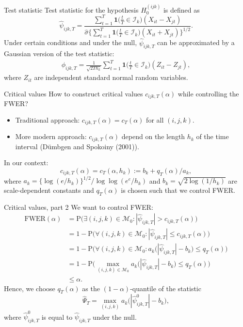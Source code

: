 \documentclass[10pt, handout]{beamer}
\newcommand{\Prob}{\mathrm{P}}
\newcommand{\ind}{\boldsymbol{1}\Big( \frac{t}{T} \in \mathcal{I}_k \Big)} %
\newcommand{\indsmall}{\boldsymbol{1}\big( \frac{t}{T} \in \mathcal{I}_k \big)} %
\begin{document}
\begin{frame}{Test statistic}
Test statistic for the hypothesis $H_0^{(ijk)}$ is defined as
\begin{equation*}
\widehat{\psi}_{ijk, T} = \frac{\sum\nolimits_{t=1}^T \indsmall (X_{it} -X_{jt})}{\hat{\sigma} \big\{ \sum\nolimits_{t=1}^T \indsmall  (X_{it} + X_{jt} )\big\}^{1/2}}. 
\end{equation*} \pause
Under certain conditions and under the null, $\widehat{\psi}_{ijk, T}$ can be approximated by a Gaussian version of the test statistic:
\begin{align*}
\phi_{ijk,T} = \frac{1}{\sqrt{2 T h_k}} \sum\limits_{t=1}^T \ind (Z_{it} - Z_{jt}), 
\end{align*}
where $Z_{it}$ are independent standard normal random variables.
\end{frame}

\begin{frame}{Critical values}
How to construct critical values $c_{ijk,T}(\alpha)$ while controlling the FWER?\pause
\begin{itemize} 
\item Traditional approach: $c_{ijk,T}(\alpha) = c_T(\alpha)$ for all $(i,j,k)$. \pause
\item More modern approach: $c_{ijk,T}(\alpha)$ depend on the length $h_k$ of the time interval (D{\"u}mbgen and Spokoiny (2001)).
\end{itemize}\pause
In our context: 
\vspace{-2mm}
\[c_{ijk,T}(\alpha) = c_T(\alpha,h_k) := b_k + q_T(\alpha)/a_k,\] where $a_k = \{\log(e/h_k)\}^{1/2} / \log \log(e^e / h_k)$ and $b_k = \sqrt{2 \log(1/h_k)}$ are scale-dependent constants and $q_T(\alpha)$ is chosen such that we control FWER.
\end{frame}


\begin{frame}{Critical values, part 2}
We want to control FWER:
\begin{align*}
\text{FWER}(\alpha) &= \Prob \Big( \exists (i,j,k) \in\mathcal{M}_0: |\widehat{\psi}_{ijk, T} | > c_{ijk, T}(\alpha) \Big) \\
&= 1 - \Prob \Big( \forall (i,j,k) \in\mathcal{M}_0: |\widehat{\psi}_{ijk, T} | \le c_{ijk, T}(\alpha) \Big)\\
 & =  1 - \Prob \Big( \forall (i,j,k) \in \mathcal{M}_0: a_k \big(|\hat{\psi}_{ijk,T}| - b_k\big) \le q_T(\alpha) \Big)\\
 & = 1 - \Prob\Big( \max_{(i,j,k) \in \mathcal{M}_0} a_k \big( |\hat{\psi}_{ijk,T}| - b_k \big) \le q_T(\alpha) \Big)\\
 & \le \alpha.
\end{align*}\pause
Hence, we choose $q_T(\alpha)$ as the $(1-\alpha)$-quantile of the statistic 
\[ \hat{\Psi}_T = \max_{(i,j,k)} a_k \big( |\hat{\psi}_{ijk,T}^0| - b_k \big), \]
where $\hat{\psi}_{ijk,T}^0$ is equal to $\hat{\psi}_{ijk,T}$ under the null.
\end{frame}
\end{document}
